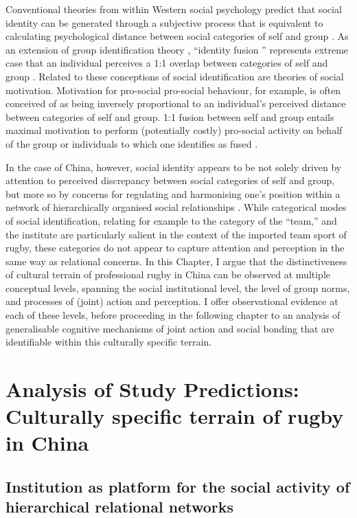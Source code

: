 \begin{CJK}{UTF8}{gbsn}
Conventional theories from within Western social psychology predict that social identity can be generated through a subjective process that is equivalent to calculating psychological distance between social categories of self and group \citep{Tajfel1971}.  As an extension of group identification theory \citep{Turner1987}, ``identity fusion '' represents extreme case that an individual perceives a 1:1 overlap between categories of self and group \citep{Swann2009}.  Related to these conceptions of social identification are theories of social motivation.  Motivation for pro-social pro-social behaviour, for example, is often conceived of as being inversely proportional to an individual's perceived distance between categories of self and group. 1:1 fusion between self and group entails maximal motivation to perform (potentially costly) pro-social activity on behalf of the group or individuals to which one identifies as fused \citep{Swann2015}.

In the case of China, however, social identity appears to be not solely driven by attention to perceived discrepancy between social categories of self and group, but more so by concerns for regulating and harmonising one's position within a network of hierarchically organised social relationships \citep{Liu2009}.  While categorical modes of social identification, relating for example to the category of the ``team,'' and the institute are particularly salient in the context of the imported team sport of rugby, these categories do not appear to capture attention and perception in the same way as relational concerns.  In this Chapter, I argue that the distinctiveness of cultural terrain of professional rugby in China can be observed at multiple conceptual levels, spanning the social institutional level,  the level of group norms, and processes of (joint) action and perception.  I offer observational evidence at each of these levels, before proceeding in the following chapter to an analysis of generalisable cognitive mechanisms of joint action and social bonding that are identifiable within this culturally specific terrain.



\section{Analysis of Study Predictions: Culturally specific terrain of rugby in China}

\subsection{Institution as platform for the social activity of hierarchical relational networks\label{sect:institutionPlatform}}


\end{CJK}
